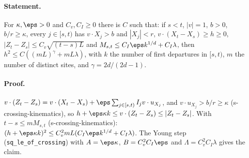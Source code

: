 \paragraph{Statement.} For $\kappa,\eps>0$ and $C_v,C_I\geq0$ there is $C$ such that: if $s<t$, $|v|=1$, $b>0$, $b/r\geq\kappa$, every
$j\in[s,t)$ has $v\cdot X_j>b$ and $|X_j|<r$, $v\cdot(X_t-X_s)\geq h\geq0$, $|Z_t-Z_s|\leq C_v\sqrt{(t-s)L}$ and
$M_{s,t}\leq C_I\eps k^{1/d}+C_I\lambda$, then $h^2\leq C((mL)^\gamma+mL\lambda)$, with $k$ the number of first departures in $[s,t)$,
$m$ the number of distinct sites, and $\gamma=2d/(2d-1)$.
\paragraph{Proof.} $v\cdot(Z_t-Z_s)=v\cdot(X_t-X_s)+\eps\sum_{j\in[s,t)}I_jv\cdot u_{X_j}$, and $v\cdot u_{X_j}>b/r\geq\kappa$ (s-crossing-kinematics),
so $h+\eps\kappa k\leq v\cdot(Z_t-Z_s)\leq|Z_t-Z_s|$. With $t-s\leq mM_{s,t}$ (s-crossing-kinematics):
$(h+\eps\kappa k)^2\leq C_v^2mL(C_I\eps k^{1/d}+C_I\lambda)$. The Young step (\texttt{sq\_le\_of\_crossing}) with $A=\eps\kappa$,
$B=C_v^2C_I\eps$ and $\Lambda=C_v^2C_I\lambda$ gives the claim.
